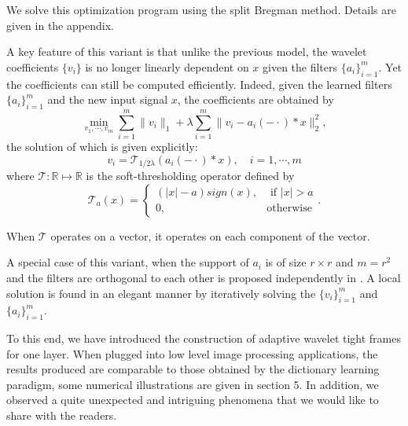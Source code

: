 \documentclass[a4paper]{article}
\begin{document}
We solve this optimization program using the split Bregman method\cite{goldstein2009split}. Details are given in the appendix.


A key feature of this variant  is that unlike the previous model, the wavelet coefficients $\{v_i\}$ is no longer linearly dependent on $x$ given the filters $\{a_i\}_{i=1}^m$. Yet the coefficients can still be computed efficiently. Indeed, given the learned filters $\{a_i\}_{i=1}^m$ and the new input signal $x$, the coefficients are obtained by 
\[
\min_{v_1,\cdots,v_m} \sum_{i=1}^m \|v_i\|_1 + \lambda \sum_{i=1}^m \|v_i - a_i(-\cdot)*x\|_2^2,
\]
the solution of which is given explicitly:
\[
v_i = \mathcal{T}_{1/2\lambda}( a_i(-\cdot)*x),\quad i=1,\cdots,m
\]
where $\mathcal{T}: \mathbb{R}\mapsto \mathbb{R}$ is the soft-thresholding operator defined by
\begin{equation}
\label{eq:soft}
\mathcal{T}_a(x)=\left\{ \begin{array}{lr}  (|x|-a)sign(x), &\textrm{ if } |x| > a \\0, &\textrm{otherwise}\end{array}\right . .
\end{equation}

When $\mathcal{T}$ operates on a vector, it operates on each component of the vector.


A special case of this variant, when the support of $a_i$ is of size $r\times r$ and $m=r^2$ and the filters are orthogonal to each other is proposed independently in \cite{cai2014data}. A local solution is found in an elegant manner by iteratively solving the $\{v_i\}_{i=1}^m$ and $\{a_i\}_{i=1}^m$.

To this end, we have introduced the construction of adaptive wavelet tight frames for one layer. When plugged into low level image processing applications, the results produced are comparable to those obtained by the dictionary learning paradigm, some numerical illustrations are given in section 5. In addition, we observed a quite unexpected and intriguing phenomena that we would like to share with the readers.
\end{document}
